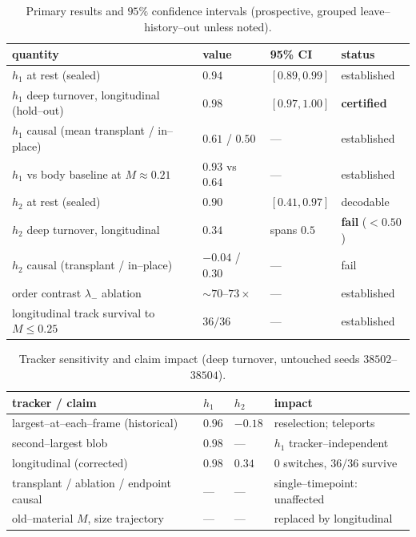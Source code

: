 \documentclass[11pt]{article}
\begin{document}
\begin{table}[t]\centering\small
\caption{Primary results and $95\%$ confidence intervals (prospective, grouped leave--history--out unless noted).}
\label{tab:results}
\begin{tabular}{@{}llll@{}}\toprule
quantity & value & 95\% CI & status\\\midrule
$h_1$ at rest (sealed) & $0.94$ & $[0.89,0.99]$ & established\\
$h_1$ deep turnover, longitudinal (hold--out) & $0.98$ & $[0.97,1.00]$ & \textbf{certified}\\
$h_1$ causal (mean transplant / in--place) & $0.61$ / $0.50$ & --- & established\\
$h_1$ vs body baseline at $M{\approx}0.21$ & $0.93$ vs $0.64$ & --- & established\\
$h_2$ at rest (sealed) & $0.90$ & $[0.41,0.97]$ & decodable\\
$h_2$ deep turnover, longitudinal & $0.34$ & spans $0.5$ & \textbf{fail} ($<0.50$)\\
$h_2$ causal (transplant / in--place) & $-0.04$ / $0.30$ & --- & fail\\
order contrast $\lambda_-$ ablation & $\sim$$70$--$73\times$ & --- & established\\
longitudinal track survival to $M{\le}0.25$ & $36/36$ & --- & established\\\bottomrule
\end{tabular}
\end{table}
\begin{table}[t]\centering\small
\caption{Tracker sensitivity and claim impact (deep turnover, untouched seeds $38502$--$38504$).}
\label{tab:tracker}
\begin{tabular}{@{}llll@{}}\toprule
tracker / claim & $h_1$ & $h_2$ & impact\\\midrule
largest--at--each--frame (historical) & $0.96$ & $-0.18$ & reselection; teleports\\
second--largest blob & $0.98$ & --- & $h_1$ tracker--independent\\
longitudinal (corrected) & $0.98$ & $0.34$ & $0$ switches, $36/36$ survive\\
transplant / ablation / endpoint causal & --- & --- & single--timepoint: unaffected\\
old--material $M$, size trajectory & --- & --- & replaced by longitudinal\\\bottomrule
\end{tabular}
\end{table}
\end{document}
